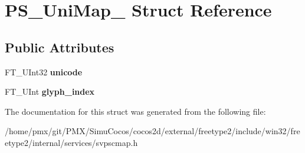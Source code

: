 \hypertarget{structPS__UniMap__}{}\section{P\+S\+\_\+\+Uni\+Map\+\_\+ Struct Reference}
\label{structPS__UniMap__}
\subsection*{Public Attributes}
\begin{DoxyCompactItemize}
\item 
\mbox{\label{structPS__UniMap___a87c1f471eb4033fc5ed9d0f1ecaf35a1}} 
F\+T\+\_\+\+U\+Int32 {\bfseries unicode}
\item 
\mbox{\label{structPS__UniMap___a0d5b2e3c405aeab1f1059a3587125cfd}} 
F\+T\+\_\+\+U\+Int {\bfseries glyph\+\_\+index}
\end{DoxyCompactItemize}


The documentation for this struct was generated from the following file\+:\begin{DoxyCompactItemize}
\item 
/home/pmx/git/\+P\+M\+X/\+Simu\+Cocos/cocos2d/external/freetype2/include/win32/freetype2/internal/services/svpscmap.\+h\end{DoxyCompactItemize}
